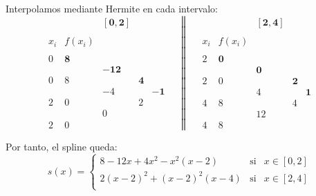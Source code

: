 \begin{ejercicio}
    Interpolamos mediante Hermite en cada intervalo:
    \begin{equation*}
        \begin{array}{c|cccc}
            &&\mathbf{[0,2]} \\ \\
            x_i & f(x_i) \\ \\
            0 & \mathbf{8} \\
            && \mathbf{-12}\\
            0 & 8 && \mathbf{4}\\
            && -4 && \mathbf{-1}\\ 
            2 & 0 && 2\\
            && 0\\
            2 & 0
        \end{array}
        \quad \left\|\quad
        \begin{array}{c|cccc}
            &&\mathbf{[2,4]} \\ \\
            x_i & f(x_i) \\ \\
            2 & \mathbf{0} \\
            && \mathbf{0}\\
            2 & 0 && \mathbf{2}\\
            && 4 && \mathbf{1}\\ 
            4 & 8 && 4\\
            && 12\\
            4 & 8
        \end{array}\right.
    \end{equation*}

    Por tanto, el spline queda:
    \begin{equation*}
        s(x)=\left\{\begin{array}{lll}
            8-12x +4x^2 -x^2(x-2) & \text{si} & x\in [0,2] \\
            2(x-2)^2 +(x-2)^2(x-4) & \text{si} & x\in [2,4] \\
        \end{array} \right.
    \end{equation*}

    
\end{ejercicio}

